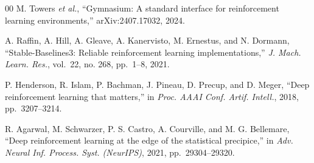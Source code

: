 \documentclass{ieeeaccess}
\begin{document}
\begin{thebibliography}{00}
 M. Towers \emph{et al.}, ``Gymnasium: A standard interface for reinforcement learning environments,'' arXiv:2407.17032, 2024.

 A. Raffin, A. Hill, A. Gleave, A. Kanervisto, M. Ernestus, and N. Dormann, ``Stable-Baselines3: Reliable reinforcement learning implementations,'' \emph{J. Mach. Learn. Res.}, vol.~22, no. 268, pp.~1--8, 2021.

 P. Henderson, R. Islam, P. Bachman, J. Pineau, D. Precup, and D. Meger, ``Deep reinforcement learning that matters,'' in \emph{Proc. AAAI Conf. Artif. Intell.}, 2018, pp.~3207--3214.

 R. Agarwal, M. Schwarzer, P. S. Castro, A. Courville, and M. G. Bellemare, ``Deep reinforcement learning at the edge of the statistical precipice,'' in \emph{Adv. Neural Inf. Process. Syst. (NeurIPS)}, 2021, pp.~29304--29320.

\end{thebibliography}

\EOD
\end{document}
